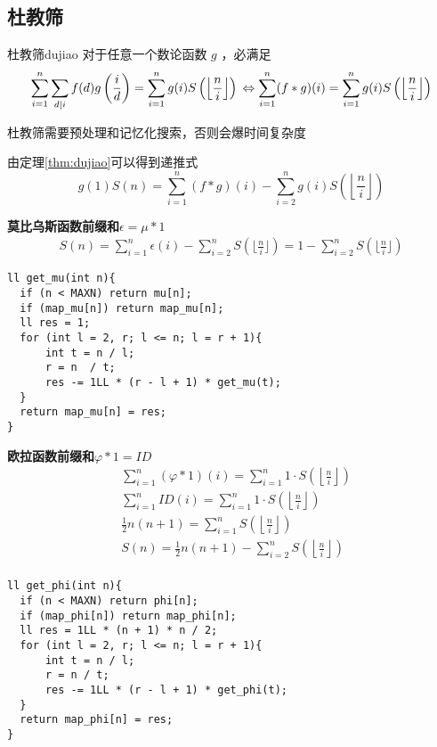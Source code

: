 \subsection{杜教筛}
\begin{theorem}{杜教筛}{dujiao}
对于任意一个数论函数 $g$ ，必满足
\begin{equation*}
  \sum_{i=1}^{n}\sum_{d \mid i}f(d)g\left(\frac{i}{d}\right)=\sum_{i=1}^{n}g(i)S\left(\left\lfloor\frac{n}{i}\right\rfloor\right)\\
\Leftrightarrow
\sum_{i=1}^{n}(f\ast g)(i)=\sum_{i=1}^{n}g(i)S\left(\left\lfloor\frac{n}{i}\right\rfloor\right)
\end{equation*}\par
\end{theorem}
\begin{note}
杜教筛需要预处理和记忆化搜索，否则会爆时间复杂度
\end{note}\par
由定理\ref{thm:dujiao}可以得到递推式
\begin{equation*}
  g(1)S(n)=\sum_{i=1}^n(f\ast g)(i)-\sum_{i=2}^ng(i)S\left(\left\lfloor\frac{n}{i}\right\rfloor\right)
\end{equation*}\par
\textbf{莫比乌斯函数前缀和}$\epsilon =\mu \ast 1$
\begin{align*}
S(n)=\sum_{i=1}^n \epsilon (i)-\sum_{i=2}^n S(\lfloor \frac n i \rfloor)= 1-\sum_{i=2}^n S(\lfloor \frac n i \rfloor)
\end{align*}
\begin{lstlisting}
ll get_mu(int n){
  if (n < MAXN) return mu[n];
  if (map_mu[n]) return map_mu[n];
  ll res = 1;
  for (int l = 2, r; l <= n; l = r + 1){
      int t = n / l;
      r = n  / t;
      res -= 1LL * (r - l + 1) * get_mu(t);
  }
  return map_mu[n] = res;
}
\end{lstlisting}\par
\textbf{欧拉函数前缀和}$\varphi\ast 1=ID$ 
\begin{align*}
  &\sum_{i=1}^n(\varphi\ast 1)(i)=\sum_{i=1}^n1\cdot S\left(\left\lfloor\frac{n}{i}\right\rfloor\right)\\
  &\sum_{i=1}^nID(i)=\sum_{i=1}^n1\cdot S\left(\left\lfloor\frac{n}{i}\right\rfloor\right)\\
  &\frac{1}{2}n(n+1)=\sum_{i=1}^nS\left(\left\lfloor\frac{n}{i}\right\rfloor\right)\\
  &S(n)=\frac{1}{2}n(n+1)-\sum_{i=2}^nS\left(\left\lfloor\frac{n}{i}\right\rfloor\right)\\
\end{align*}
\begin{lstlisting}
ll get_phi(int n){
  if (n < MAXN) return phi[n];
  if (map_phi[n]) return map_phi[n];
  ll res = 1LL * (n + 1) * n / 2;
  for (int l = 2, r; l <= n; l = r + 1){
      int t = n / l;
      r = n / t;
      res -= 1LL * (r - l + 1) * get_phi(t);
  }
  return map_phi[n] = res;
}
\end{lstlisting}


